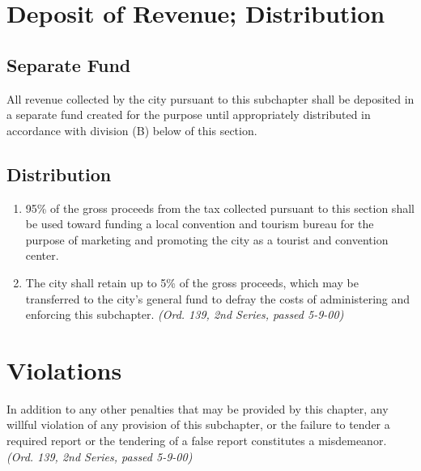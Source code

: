 \section{Deposit of Revenue; Distribution}
\subsection{Separate Fund}
All revenue collected by the city pursuant to this subchapter shall be deposited in a separate fund created for the purpose until appropriately distributed in accordance with division (B) below of this section.
\subsection{Distribution}
\begin{enumerate}
\item 95\% of the gross proceeds from the tax collected pursuant to this section shall be used toward funding a local convention and tourism bureau for the purpose of marketing and promoting the city as a tourist and convention center.
\item The city shall retain up to 5\% of the gross proceeds, which may be transferred to the city’s general fund to defray the costs of administering and enforcing this subchapter.\newline
\emph{(Ord. 139, 2nd Series, passed 5-9-00)}
\end{enumerate}

\section{Violations}
In addition to any other penalties that may be provided by this chapter, any willful violation of any provision of this subchapter, or the failure to tender a required report or the tendering of a false report constitutes a misdemeanor.\newline
\emph{(Ord. 139, 2nd Series, passed 5-9-00)}


%
